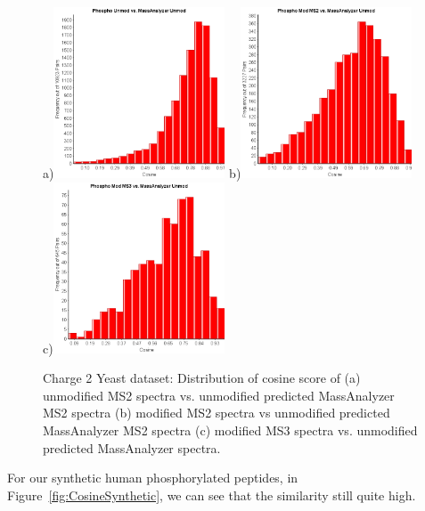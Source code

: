 \begin{figure}[htbp]
\centering
a)\includegraphics[width=2in,height=2in]{fig/phospho/cosine_unmod_vs_massanalyzer.png}
b)\includegraphics[width=2in,height=2in]{fig/phospho/cosine_mod_ms2_vs_massanalyzer.png}
c)\includegraphics[width=2in,height=2in]{fig/phospho/cosine_mod_ms3_vs_massanalyzer.png}
\caption{Charge 2 Yeast dataset: Distribution of cosine score of (a) unmodified MS2 spectra vs. unmodified predicted MassAnalyzer MS2 spectra 
(b) modified MS2 spectra vs unmodified predicted MassAnalyzer MS2 spectra (c) modified MS3 spectra vs. unmodified predicted MassAnalyzer spectra.}
\label{fig:CosineMassAnalyzer}
\end{figure}

For our synthetic human phosphorylated peptides, in Figure~\ref{fig:CosineSynthetic}, we can see that the similarity still 
quite high.

